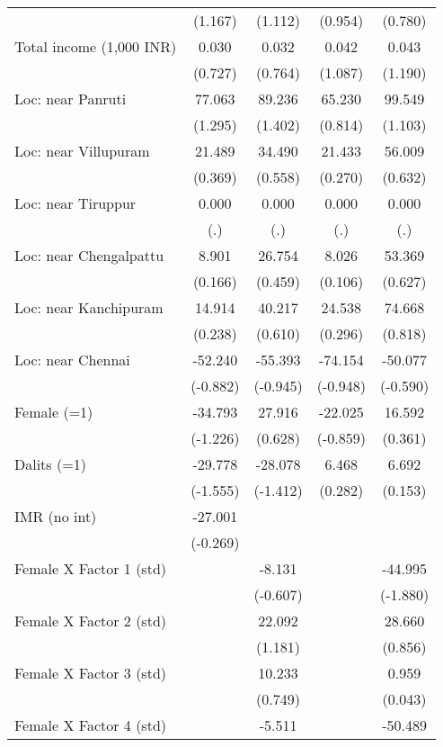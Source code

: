 \begin{table}[htbp]
{\begin{tabular}{lcccc}
          & (1.167) & (1.112) & (0.954) & (0.780) \\
    Total income (1,000 INR) & 0.030 & 0.032 & 0.042 & 0.043 \\
          & (0.727) & (0.764) & (1.087) & (1.190) \\
    Loc: near Panruti & 77.063 & 89.236 & 65.230 & 99.549 \\
          & (1.295) & (1.402) & (0.814) & (1.103) \\
    Loc: near Villupuram & 21.489 & 34.490 & 21.433 & 56.009 \\
          & (0.369) & (0.558) & (0.270) & (0.632) \\
    Loc: near Tiruppur & 0.000 & 0.000 & 0.000 & 0.000 \\
          & (.)   & (.)   & (.)   & (.) \\
    Loc: near Chengalpattu & 8.901 & 26.754 & 8.026 & 53.369 \\
          & (0.166) & (0.459) & (0.106) & (0.627) \\
    Loc: near Kanchipuram & 14.914 & 40.217 & 24.538 & 74.668 \\
          & (0.238) & (0.610) & (0.296) & (0.818) \\
    Loc: near Chennai & -52.240 & -55.393 & -74.154 & -50.077 \\
          & (-0.882) & (-0.945) & (-0.948) & (-0.590) \\
    Female (=1) & -34.793 & 27.916 & -22.025 & 16.592 \\
          & (-1.226) & (0.628) & (-0.859) & (0.361) \\
    Dalits (=1) & -29.778 & -28.078 & 6.468 & 6.692 \\
          & (-1.555) & (-1.412) & (0.282) & (0.153) \\
    IMR (no int) & -27.001 &       &       &  \\
          & (-0.269) &       &       &  \\
    Female X Factor 1 (std) &       & -8.131 &       & -44.995 \\
          &       & (-0.607) &       & (-1.880) \\
    Female X Factor 2 (std) &       & 22.092 &       & 28.660 \\
          &       & (1.181) &       & (0.856) \\
    Female X Factor 3 (std) &       & 10.233 &       & 0.959 \\
          &       & (0.749) &       & (0.043) \\
    Female X Factor 4 (std) &       & -5.511 &       & -50.489 \\

\end{tabular}}
\end{table}
